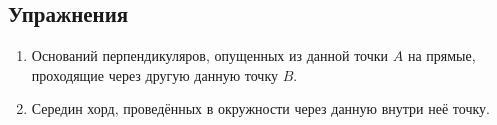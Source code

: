 \documentclass[twoside]{book}
\begin{document}
\subsection*{Упражнения}

\begin{center}
\end{center}

\begin{enumerate}


 \item
Оснований перпендикуляров, опущенных из данной точки $A$ на прямые, проходящие через другую данную точку $B$.

 \item
Середин хорд, проведённых в окружности через данную внутри неё точку.

\end{enumerate}

\smallskip
{}
\end{document}
